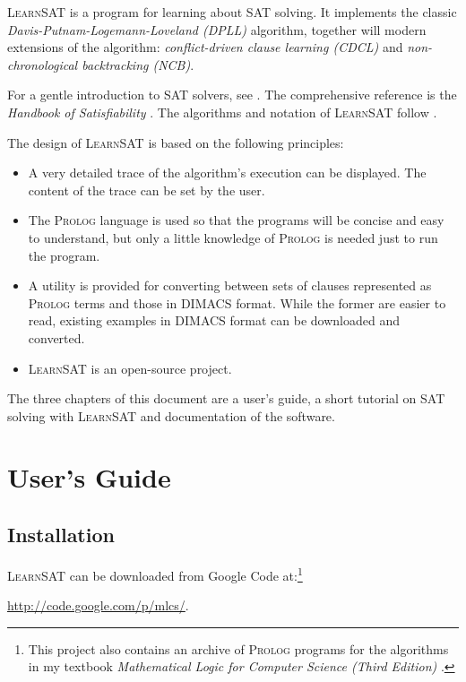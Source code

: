 \documentclass[11pt]{report}
\newcommand*{\ls}{\textsc{LearnSAT}}
\newcommand*{\pl}{\textsc{Prolog}}
\begin{document}
\ls{} is a program for learning about SAT solving. It implements the
classic \emph{Davis-Putnam-Logemann-Loveland (DPLL)} algorithm, together
will modern extensions of the algorithm: \emph{conflict-driven clause
learning (CDCL)} and \emph{non-chronological backtracking (NCB)}.

For a gentle introduction to SAT solvers, see \cite[Chapter~6]{mlcs}.
The comprehensive reference is the \emph{Handbook of Satisfiability}
\cite{SAT}. The algorithms and notation of \ls{} follow \cite{mlm}.

The design of \ls{} is based on the following principles:

\begin{itemize}

\item A very detailed trace of the algorithm's execution can be
displayed. The content of the trace can be set by the user.

\item The \pl{} language is used so that the programs will be concise
and easy to understand, but only a little knowledge of \pl{} is needed
just to run the program.

\item A utility is provided for converting between sets of clauses
represented as \pl{} terms and those in DIMACS format. While the former
are easier to read, existing examples in DIMACS format can be downloaded
and converted.

\item \ls{} is an open-source project.
\end{itemize}

The three chapters of this document are a user's guide, a short tutorial
on SAT solving with \ls{} and documentation of the software.


\chapter{User's Guide}

\section{Installation}

\ls{} can be downloaded from Google Code at:\footnote{This project also
contains an archive of \pl{} programs for the algorithms in my textbook
\emph{Mathematical Logic for Computer Science (Third Edition)}
\cite{mlcs}.}
\begin{center}
\url{http://code.google.com/p/mlcs/}.
\end{center}
\end{document}

